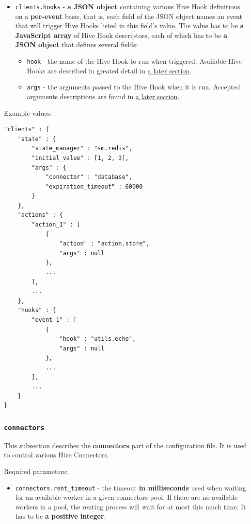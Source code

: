 \documentclass[a4paper]{article}
\begin{document}
\label{ref-hooks_config}

\begin{itemize}
\item \texttt{clients.hooks} - \textbf{a JSON object} containing various Hive Hook definitions on a \textbf{per-event} basis, that is, each field of the JSON object names an event that will trigger Hive Hooks listed in this field's value. The value has to be \textbf{a JavaScript array} of Hive Hook descriptors, each of which has to be \textbf{a JSON object} that defines several fields:
\begin{itemize}
\item \texttt{hook} - the name of the Hive Hook to run when triggered. Available Hive Hooks are described in greated detail in \hyperref[sec-9-2]{a later section}.
\item \texttt{args} - the arguments passed to the Hive Hook when it is run. Accepted arguments descriptions are found in \hyperref[sec-9-2]{a later section}.
\end{itemize}
\end{itemize}

\noindent
Example values:


\begin{verbatim}
"clients" : {
    "state" : {
        "state_manager" : "sm.redis",
        "initial_value" : [1, 2, 3],
        "args" : {
            "connector" : "database",
            "expiration_timeout" : 60000
        }
    },
    "actions" : {
        "action_1" : [
            {
                "action" : "action.store",
                "args" : null
            },
            ...
        ],
        ...
    },
    "hooks" : {
        "event_1" : [
            {
                "hook" : "utils.echo",
                "args" : null
            },
            ...
        ],
        ...
    }
}
\end{verbatim}
\subsubsection{\texttt{connectors}}
\label{sec-3-1-4}

This subsection describes the \textbf{connectors} part of the configuration file. It is used to control various Hive Connectors.

\noindent
Required parameters:

\begin{itemize}
\item \texttt{connectors.rent\_timeout} - the timeout \textbf{in milliseconds} used when waiting for an available worker in a given connectors pool. If there are no available workers in a pool, the renting process will wait for at most this much time. It has to be \textbf{a positive integer}.
\end{itemize}
\end{document}
